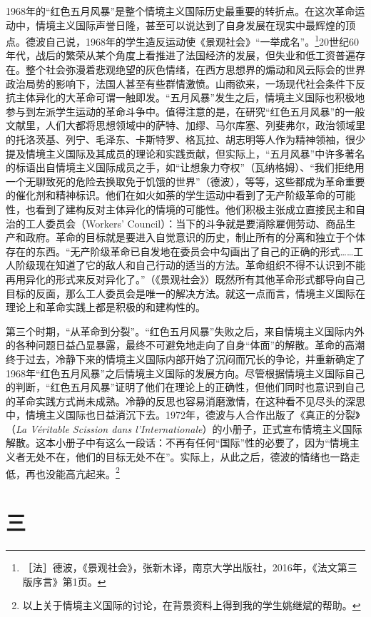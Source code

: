 \documentclass[fontset=fandol, a4paper, 12pt, openright]{ctexbook}
\begin{document}
1968年的“红色五月风暴”是整个情境主义国际历史最重要的转折点。在这次革命运动中，情境主义国际声誉日隆，甚至可以说达到了自身发展在现实中最辉煌的顶点。德波自己说，1968年的学生造反运动使《景观社会》“一举成名”。\footnote{［法］德波，《景观社会》，张新木译，南京大学出版社，2016年，《法文第三版序言》第1页。}20世纪60年代，战后的繁荣从某个角度上看推进了法国经济的发展，但失业和低工资普遍存在。整个社会弥漫着悲观绝望的灰色情绪，在西方思想界的煽动和风云际会的世界政治局势的影响下，法国人甚至有些群情激愤。山雨欲来，一场现代社会条件下反抗主体异化的大革命可谓一触即发。“五月风暴”发生之后，情境主义国际也积极地参与到左派学生运动的革命斗争中。值得注意的是，在研究“红色五月风暴”的一般文献里，人们大都将思想领域中的萨特、加缪、马尔库塞、列斐弗尔，政治领域里的托洛茨基、列宁、毛泽东、卡斯特罗、格瓦拉、胡志明等人作为精神领袖，很少提及情境主义国际及其成员的理论和实践贡献，但实际上，“五月风暴”中许多著名的标语出自情境主义国际成员之手，如“让想象力夺权”（瓦纳格姆）、“我们拒绝用一个无聊致死的危险去换取免于饥饿的世界”（德波），等等，这些都成为革命重要的催化剂和精神标识。他们在如火如荼的学生运动中看到了无产阶级革命的可能性，也看到了建构反对主体异化的情境的可能性。他们积极主张成立直接民主和自治的工人委员会（Workers' Council）：当下的斗争就是要消除雇佣劳动、商品生产和政府。革命的目标就是要进入自觉意识的历史，制止所有的分离和独立于个体存在的东西。“无产阶级革命已自发地在委员会中勾画出了自己的正确的形式……工人阶级现在知道了它的敌人和自己行动的适当的方法。革命组织不得不认识到不能再用异化的形式来反对异化了。”（《景观社会》）既然所有其他革命形式都导向自己目标的反面，那么工人委员会是唯一的解决方法。就这一点而言，情境主义国际在理论上和革命实践上都是积极的和建构性的。

第三个时期，“从革命到分裂”。“红色五月风暴”失败之后，来自情境主义国际内外的各种问题日益凸显暴露，最终不可避免地走向了自身“体面”的解散。革命的高潮终于过去，冷静下来的情境主义国际内部开始了沉闷而冗长的争论，并重新确定了1968年“红色五月风暴”之后情境主义国际的发展方向。尽管根据情境主义国际自己的判断，“红色五月风暴”证明了他们在理论上的正确性，但他们同时也意识到自己的革命实践方式尚未成熟。冷静的反思也容易消磨激情，在这种看不见尽头的深思中，情境主义国际也日益消沉下去。1972年，德波与人合作出版了《真正的分裂》（\textit{La Véritable Scission dans l'Internationale}）的小册子，正式宣布情境主义国际解散。这本小册子中有这么一段话：不再有任何“国际”性的必要了，因为“情境主义者无处不在，他们的目标无处不在”。实际上，从此之后，德波的情绪也一路走低，再也没能高亢起来。\footnote{以上关于情境主义国际的讨论，在背景资料上得到我的学生姚继斌的帮助。}

\section*{三}
\end{document}
